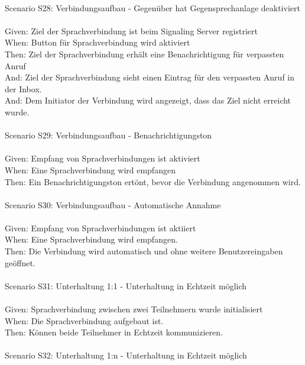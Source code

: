 \begin{tabbing}
    \\
    Scenario S28: \> \> \> Verbindungsaufbau - Gegenüber hat Gegensprechanlage deaktiviert \\ \\
    Given:  \> \> \> Ziel der Sprachverbindung ist beim Signaling Server registriert\\
    When:   \> \> \> Button für Sprachverbindung wird aktiviert\\
    Then:   \> \> \> Ziel der Sprachverbindung erhält eine Benachrichtigung für verpassten Anruf\\
    And:   \> \> \> Ziel der Sprachverbindung sieht einen Eintrag für den verpassten Anruf in der Inbox.\\
    And:   \> \> \> Dem Initiator der Verbindung wird angezeigt, dass das Ziel nicht erreicht wurde. \\
    \\
    Scenario S29: \> \> \> Verbindungsaufbau - Benachrichtigungston \\ \\
    Given:  \> \> \> Empfang von Sprachverbindungen ist aktiviert\\
    When:   \> \> \> Eine Sprachverbindung wird empfangen\\
    Then:   \> \> \> Ein Benachrichtigungston ertönt, bevor die Verbindung angenommen wird.\\
    \\
    Scenario S30: \> \> \> Verbindungsaufbau - Automatische Annahme \\ \\
    Given:  \> \> \> Empfang von Sprachverbindungen ist aktiiert\\
    When:   \> \> \> Eine Sprachverbindung wird empfangen.\\
    Then:   \> \> \> Die Verbindung wird automatisch und ohne weitere Benutzereingaben geöffnet. \\
    \\
    Scenario S31: \> \> \> Unterhaltung 1:1 - Unterhaltung in Echtzeit möglich \\ \\
    Given:  \> \> \> Sprachverbindung zwischen zwei Teilnehmern wurde initialisiert\\
    When:   \> \> \> Die Sprachverbindung aufgebaut ist. \\
    Then:   \> \> \> Können beide Teilnehmer in Echtzeit kommunizieren.\\
    \\
    Scenario S32: \> \> \> Unterhaltung 1:n - Unterhaltung in Echtzeit möglich \\ \\

\end{tabbing}
